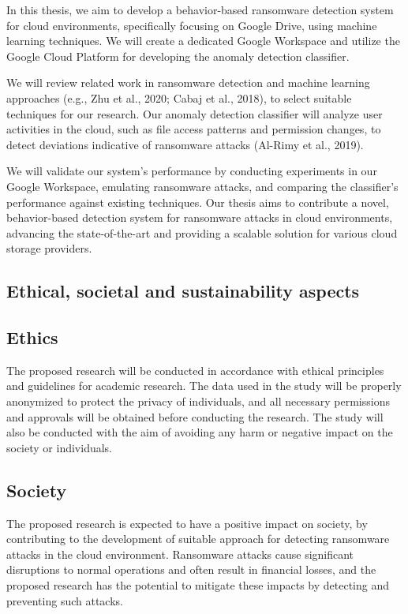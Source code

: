 \documentclass[12pt,a4paper,twoside]{article}
\begin{document}
In this thesis, we aim to develop a behavior-based ransomware detection system for cloud environments, specifically focusing on Google Drive, using machine learning techniques. We will create a dedicated Google Workspace and utilize the Google Cloud Platform for developing the anomaly detection classifier.

We will review related work in ransomware detection and machine learning approaches (e.g., Zhu et al., 2020; Cabaj et al., 2018), \cite{zhu2019ransomware} \cite{cabaj2018machine} to select suitable techniques for our research. Our anomaly detection classifier will analyze user activities in the cloud, such as file access patterns and permission changes, to detect deviations indicative of ransomware attacks (Al-Rimy et al., 2019). \cite{alrimy2019ransomclassifier}

We will validate our system's performance by conducting experiments in our Google Workspace, emulating ransomware attacks, and comparing the classifier's performance against existing techniques. Our thesis aims to contribute a novel, behavior-based detection system for ransomware attacks in cloud environments, advancing the state-of-the-art and providing a scalable solution for various cloud storage providers.


\subsection{Ethical, societal and sustainability aspects}
\label{sec:ethics}


\subsection{Ethics}\label{sec:Ethics}

The proposed research will be conducted in accordance with ethical principles and guidelines for academic research. The data used in the study will be properly anonymized to protect the privacy of individuals, and all necessary permissions and approvals will be obtained before conducting the research. The study will also be conducted with the aim of avoiding any harm or negative impact on the society or individuals.


\subsection{Society}\label{sec:Society}

The proposed research is expected to have a positive impact on society, by contributing to the development of suitable approach for detecting ransomware attacks in the cloud environment. Ransomware attacks cause significant disruptions to normal operations and often result in financial losses, and the proposed research has the potential to mitigate these impacts by detecting and preventing such attacks.
\end{document}
